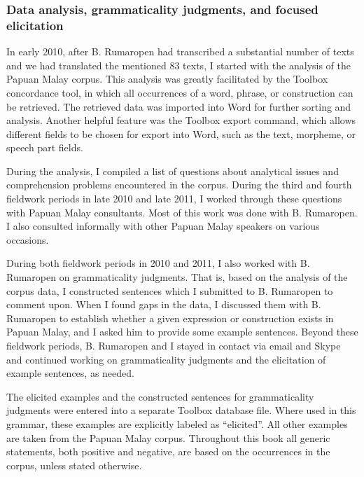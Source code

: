 {\subsubsection[Data analysis, grammaticality judgments, and {focused elicitation}]{Data analysis, grammaticality judgments, and focused elicitation}
\label{Para_1.11.5.2}
In early 2010, after B. Rumaropen had transcribed a substantial number of texts and we had translated the mentioned 83 texts, I started with the analysis of the Papuan Malay corpus. This analysis was greatly facilitated by the Toolbox concordance tool, in which all occurrences of a word, phrase, or construction can be retrieved. The retrieved data was imported into Word for further sorting and analysis. Another helpful feature was the Toolbox export command, which allows different fields to be chosen for export into Word, such as the text, morpheme, or speech part fields.

 
During the analysis, I compiled a list of questions about analytical issues and comprehension problems encountered in the corpus. During the third and fourth fieldwork periods in late 2010 and late 2011, I worked through these questions with Papuan Malay consultants. Most of this work was done with B. Rumaropen. I also consulted informally with other Papuan Malay speakers on various occasions.



During both fieldwork periods in 2010 and 2011, I also worked with B. Rumaropen on grammaticality judgments. That is, based on the analysis of the corpus data, I constructed sentences which I submitted to B. Rumaropen to comment upon. When I found gaps in the data, I discussed them with B. Rumaropen to establish whether a given expression or construction exists in Papuan Malay, and I asked him to provide some example sentences. Beyond these fieldwork periods, B. Rumaropen and I stayed in contact via email and Skype and continued working on grammaticality judgments and the elicitation of example sentences, as needed.



The elicited examples and the constructed sentences for grammaticality judgments were entered into a separate Toolbox database file. Where used in this grammar, these examples are explicitly labeled as  ``elicited''. All other examples are taken from the Papuan Malay corpus. Throughout this book all generic statements, both positive and negative, are based on the occurrences in the corpus, unless stated otherwise.


}
